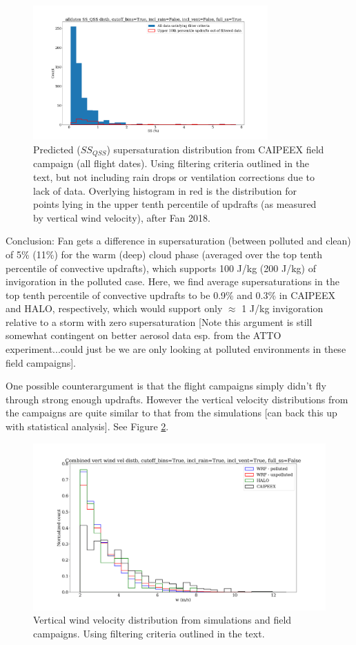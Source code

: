 \documentclass{article}
\begin{document}
\begin{figure}[ht]
    \centering
    \includegraphics[width=9cm]{revcaipeex/v10_with_up10perc_ss_qss_hist_alldates_figure.png}
    \caption{Predicted ($SS_{QSS}$) supersaturation distribution from CAIPEEX field campaign (all flight dates). Using filtering criteria outlined in the text, but not including rain drops or ventilation corrections due to lack of data. Overlying histogram in red is the distribution for points lying in the upper tenth percentile of updrafts (as measured by vertical wind velocity), after Fan 2018.}
    \label{caipeexqsshist}
\end{figure}

Conclusion: Fan gets a difference in supersaturation (between polluted and clean) of 5\% (11\%) for the warm (deep) cloud phase (averaged over the top tenth percentile of convective updrafts), which supports 100 J/kg (200 J/kg) of invigoration in the polluted case. Here, we find average supersaturations in the top tenth percentile of convective updrafts to be 0.9\% and 0.3\% in CAIPEEX and HALO, respectively, which would support only $\approx$ 1 J/kg invigoration relative to a storm with zero supersaturation [Note this argument is still somewhat contingent on better aerosol data esp. from the ATTO experiment...could just be we are only looking at polluted environments in these field campaigns]. 

One possible counterargument is that the flight campaigns simply didn't fly through strong enough updrafts. However the vertical velocity distributions from the campaigns are quite similar to that from the simulations [can back this up with statistical analysis]. See Figure \ref{combinedwhist}. 

\begin{figure}[ht]
    \centering
    \includegraphics[width=12cm]{revmywrf/v9_combined_w_hist_figure.png}
    \caption{Vertical wind velocity distribution from simulations and field campaigns. Using filtering criteria outlined in the text.}
    \label{combinedwhist}
\end{figure}
\end{document}
